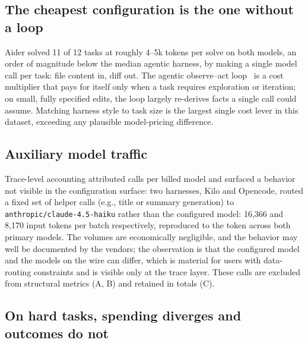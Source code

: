 \documentclass[11pt]{article}
\newcommand{\harness}[1]{\textsf{#1}}
\begin{document}
\subsection{The cheapest configuration is the one without a loop}
\label{sec:oneshot}

\harness{Aider} solved 11 of 12 tasks at roughly 4--5k tokens per solve on both models, an order of magnitude below the median agentic harness, by making a single model call per task: file content in, diff out. The agentic observe--act loop~\citep{yao2023react} is a cost multiplier that pays for itself only when a task requires exploration or iteration; on small, fully specified edits, the loop largely re-derives facts a single call could assume. Matching harness style to task size is the largest single cost lever in this dataset, exceeding any plausible model-pricing difference.

\subsection{Auxiliary model traffic}
\label{sec:aux}

Trace-level accounting attributed calls per billed model and surfaced a behavior not visible in the configuration surface: two harnesses, \harness{Kilo} and \harness{Opencode}, routed a fixed set of helper calls (e.g., title or summary generation) to \texttt{anthropic/claude-4.5-haiku} rather than the configured model: 16{,}366 and 8{,}170 input tokens per batch respectively, reproduced to the token across both primary models. The volumes are economically negligible, and the behavior may well be documented by the vendors; the observation is that the configured model and the models on the wire can differ, which is material for users with data-routing constraints and is visible only at the trace layer. These calls are excluded from structural metrics (A, B) and retained in totals (C).

\subsection{On hard tasks, spending diverges and outcomes do not}
\label{sec:swe}
\end{document}
